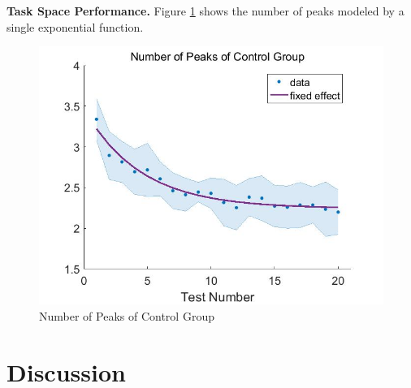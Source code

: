 \textbf{Task Space Performance.}
Figure \ref{fig:nopcontrol} shows the number of peaks modeled by a single exponential function.
\begin{figure}
	\centering
	\includegraphics[width=0.7\linewidth]{figures/nopControl}
	\caption[Number of Peaks of Control Group]{Number of Peaks of Control Group}
	\label{fig:nopcontrol}
\end{figure}


\section{Discussion}



